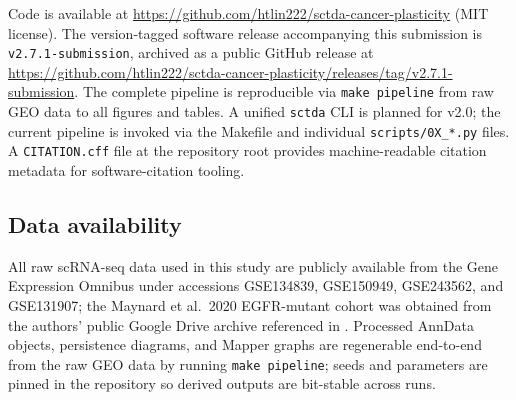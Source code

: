 Code is available at \url{https://github.com/htlin222/sctda-cancer-plasticity} (MIT license). The version-tagged software release accompanying this submission is \texttt{v2.7.1-submission}, archived as a public GitHub release at \url{https://github.com/htlin222/sctda-cancer-plasticity/releases/tag/v2.7.1-submission}. The complete pipeline is reproducible via \texttt{make pipeline} from raw GEO data to all figures and tables. A unified \texttt{sctda} CLI is planned for v2.0; the current pipeline is invoked via the Makefile and individual \texttt{scripts/0X\_*.py} files. A \texttt{CITATION.cff} file at the repository root provides machine-readable citation metadata for software-citation tooling.

\subsection*{Data availability}

All raw scRNA-seq data used in this study are publicly available from
the Gene Expression Omnibus under accessions GSE134839, GSE150949,
GSE243562, and GSE131907; the Maynard et al.\ 2020 EGFR-mutant cohort
was obtained from the authors' public Google Drive archive referenced in
\citet{maynard2020}. Processed AnnData objects, persistence diagrams,
and Mapper graphs are regenerable end-to-end from the raw GEO data by
running \texttt{make pipeline}; seeds and parameters are pinned in the
repository so derived outputs are bit-stable across runs.
